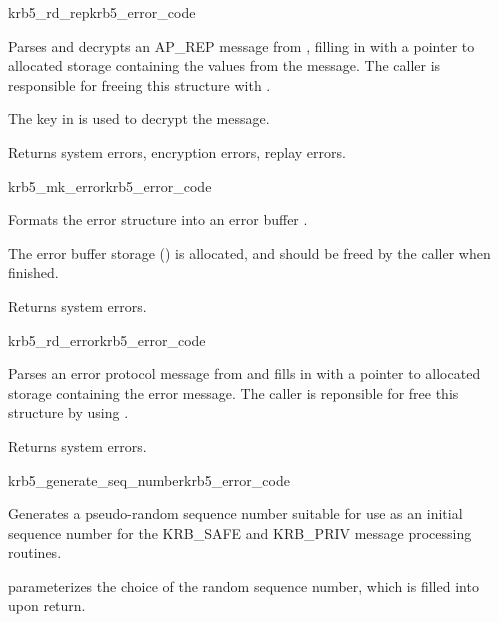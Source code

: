 \begin{funcdecl}{krb5_rd_rep}{krb5_error_code}{\funcin}
\funcout
{}
\end{funcdecl}

Parses and decrypts an AP_REP message from , filling in
 with a pointer to  allocated storage containing the
values from the message.  The caller is responsible for freeing this
structure with .

The key in  is used to decrypt the message.

Returns system errors, encryption errors, replay errors.

\begin{funcdecl}{krb5_mk_error}{krb5_error_code}{\funcin}
\funcout
{}
\end{funcdecl}

Formats the error structure  into an error buffer
.

The error buffer storage () is
allocated, and should be freed by the caller when finished.

Returns system errors.

\begin{funcdecl}{krb5_rd_error}{krb5_error_code}{\funcin}
\funcout
{}
\end{funcdecl}

Parses an error protocol message from  and fills in 
 with a pointer to allocated storage containing
the error message.  The caller is reponsible for free this structure by
using .

Returns system errors.

\begin{funcdecl}{krb5_generate_seq_number}{krb5_error_code}{\funcin}
\funcout
{}
\end{funcdecl}

Generates a pseudo-random sequence number suitable for use as an initial
sequence number for the KRB_SAFE and KRB_PRIV message processing
routines.

 parameterizes the choice of the random sequence number,
which is filled into  upon return.

